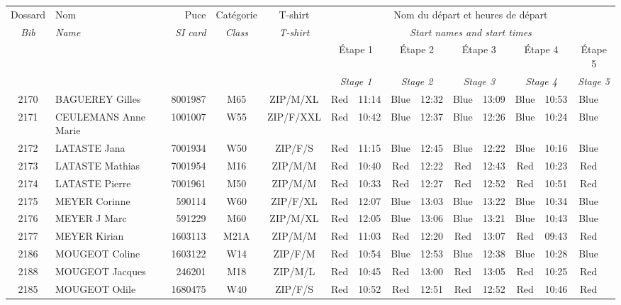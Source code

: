 \documentclass{report}
\begin{document}
  \begin{longtable}{|c|l|r|c|c|*{5}{cc|}}
    Dossard & Nom  & Puce    & Catégorie & T-shirt & \multicolumn{10}{c|}{Nom du départ et heures de départ} \\
    \itshape Bib     & \itshape Name & \itshape SI card & \itshape Class  & \itshape  T-shirt  & \multicolumn{10}{c|}{\itshape Start names and start times} \\
    \hline
    & & & & & \multicolumn{2}{c|}{Étape 1} & \multicolumn{2}{c|}{Étape 2} & \multicolumn{2}{c|}{Étape 3} & \multicolumn{2}{c|}{Étape 4} & \multicolumn{2}{c|}{Étape 5} \\
    & & & & & \multicolumn{2}{c|}{\itshape Stage 1} & \multicolumn{2}{c|}{\itshape Stage 2} & \multicolumn{2}{c|}{\itshape Stage 3} & \multicolumn{2}{c|}{\itshape Stage 4} & \multicolumn{2}{c|}{\itshape Stage 5} \\
    \hline
    2170 & BAGUEREY Gilles & 8001987 & M65 & ZIP/M/XL & Red & 11:14 & Blue & 12:32 & Blue & 13:09 & Blue & 10:53 & Blue &  \\
    2171 & CEULEMANS Anne Marie & 1001007 & W55 & ZIP/F/XXL & Red & 10:42 & Blue & 12:37 & Blue & 12:26 & Blue & 10:24 & Blue &  \\
    2172 & LATASTE Jana & 7001934 & W50 & ZIP/F/S & Red & 11:15 & Blue & 12:45 & Blue & 12:22 & Blue & 10:16 & Blue &  \\
    2173 & LATASTE Mathias & 7001954 & M16 & ZIP/M/M & Red & 10:40 & Red & 12:22 & Red & 12:43 & Red & 10:23 & Red &  \\
    2174 & LATASTE Pierre & 7001961 & M50 & ZIP/M/M & Red & 10:33 & Red & 12:27 & Red & 12:52 & Red & 10:51 & Red &  \\
    2175 & MEYER Corinne & 590114 & W60 & ZIP/F/XL & Red & 12:07 & Blue & 13:03 & Blue & 13:22 & Blue & 10:34 & Blue &  \\
    2176 & MEYER J Marc & 591229 & M60 & ZIP/M/XL & Red & 12:05 & Blue & 13:06 & Blue & 13:21 & Blue & 10:43 & Blue &  \\
    2177 & MEYER Kirian & 1603113 & M21A & ZIP/M/M & Red & 11:03 & Red & 12:20 & Red & 13:07 & Red & 09:43 & Red &  \\
    2186 & MOUGEOT Coline & 1603122 & W14 & ZIP/F/M & Red & 10:54 & Blue & 12:53 & Blue & 12:38 & Blue & 10:28 & Blue &  \\
    2188 & MOUGEOT Jacques & 246201 & M18 & ZIP/M/L & Red & 10:45 & Red & 13:00 & Red & 13:05 & Red & 10:25 & Red &  \\
    2185 & MOUGEOT Odile & 1680475 & W40 & ZIP/F/S & Red & 10:52 & Red & 12:51 & Red & 12:52 & Red & 10:46 & Red &  \\

\end{longtable}
\end{document}
